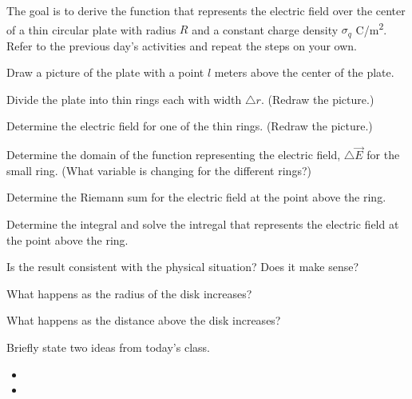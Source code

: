 \begin{problem}
  \item The goal is to derive the function that represents the electric field over the center of
    a thin circular plate with radius $R$ and a constant charge density $\sigma_q$ C/m\textsuperscript{2}.
    Refer to the previous day's activities and repeat the steps on your own.
  \begin{subproblem}
    \item Draw a picture of the plate with a point $l$ meters above the center of the plate.
      \vfill
   \item Divide the plate into thin rings each with width $\triangle r$.  (Redraw the picture.)
      \vfill
   \item Determine the electric field for one of the thin rings.  (Redraw the picture.)
       \vfill

    \clearpage

   \item Determine the domain of the function representing the electric field, $\triangle \vec{E}$
      for the small ring. (What variable is changing for the different rings?)
      \vspace{2em}

    \item Determine the Riemann sum for the electric field at the point above the ring.
      \vfill

    \item Determine the integral and solve the intregal that represents the electric field at the point above the ring.
      \vfill
      \vfill
      \vfill

    \clearpage

    \item Is the result consistent with the physical situation? Does it make sense?
       \vfill

     \item What happens as the radius of the disk increases?
        \vfill

      \item What happens as the distance above the disk increases?
       \vfill

  \end{subproblem}
\end{problem}

\postClass

\begin{problem}
\item Briefly state two ideas from today's class.
  \begin{itemize}
  \item
  \item
  \end{itemize}
\end{problem}

